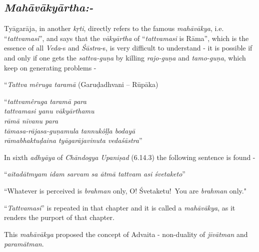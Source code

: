 \vspace{-.3cm}

\subsection*{\textit{Mahāvākyārtha:-}}

\vspace{-.2cm}

Tyāgarāja, in another \textit{kṛti}, directly refers to the famous \textit{mahāvākya}, i.e. “\textit{tattvamasi}”, and says that the \textit{vākyārtha} of “\textit{tattvamasi} is Rāma”, which is the essence of all \textit{Veda}-s and \textit{Śāstra}-s, is very difficult to understand - it is possible if and only if one gets the \textit{sattva-guṇa} by killing \textit{rajo-guṇa} and \textit{tamo-guṇa}, which keep on generating problems -

“\textit{Tattva mêruga taramā} (Garuḍadhvani – Rūpāka)

\begin{centerquote}
“\textit{tattvamêruga taramā para}\\ \textit{tattvamasi yanu vākyārthamu}\\ \textit{rāmā nīvanu para}\\ \textit{tāmasa-rājasa-guṇamula tannukôḷḷa bodayā}\\ \textit{rāmabhaktuḍaina tyāgarājavinuta vedaśāstra}”
\end{centerquote}

In sixth \textit{adhyāya} of \textit{Chāndogya Upaniṣad} (6.14.3) the following sentence is found -

\vspace{-.2cm}

\begin{myquote}
\qquad\qquad“\textit{aitadātmyam idam sarvam sa ātmā tattvam asi śvetaketo}”
\end{myquote}

``Whatever is perceived is \textit{brahman} only, O! Śvetaketu!~You are \textit{brahman} only."

“\textit{Tattvamasi}” is repeated in that chapter and it is called a \textit{mahāvākya}, as it renders the purport of that chapter.

This \textit{mahāvākya} proposed the concept of Advaita - non-duality of \textit{jīvātman} and \textit{paramātman}.

